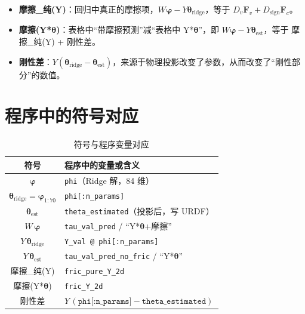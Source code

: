 \documentclass[12pt,a4paper]{article}
\begin{document}
\begin{itemize}[leftmargin=*]
  \item \textbf{摩擦\_纯(Y)}：回归中真正的摩擦项，$W\bm{\varphi} - Y\bm{\theta}_{\mathrm{ridge}}$，等于 $D_v\bm{F}_v + D_{\mathrm{sign}}\bm{F}_c$。
  \item \textbf{摩擦(Y*$\bm{\theta}$)}：表格中``带摩擦预测''减``表格中 Y*$\bm{\theta}$''，即 $W\bm{\varphi} - Y\bm{\theta}_{\mathrm{est}}$，等于 摩擦\_纯(Y) + 刚性差。
  \item \textbf{刚性差}：$Y(\bm{\theta}_{\mathrm{ridge}} - \bm{\theta}_{\mathrm{est}})$，来源于物理投影改变了参数，从而改变了``刚性部分''的数值。
\end{itemize}

\section{程序中的符号对应}

\begin{table}[h]
  \centering
  \caption{符号与程序变量对应}
  \begin{tabular}{cl}
    \toprule
    符号 & 程序中的变量或含义 \\
    \midrule
    $\bm{\varphi}$ & \texttt{phi}（Ridge 解，84 维） \\
    $\bm{\theta}_{\mathrm{ridge}} = \bm{\varphi}_{1:70}$ & \texttt{phi[:n\_params]} \\
    $\bm{\theta}_{\mathrm{est}}$ & \texttt{theta\_estimated}（投影后，写 URDF） \\
    $W\,\bm{\varphi}$ & \texttt{tau\_val\_pred} / ``Y*$\bm{\theta}$+摩擦'' \\
    $Y\,\bm{\theta}_{\mathrm{ridge}}$ & \texttt{Y\_val @ phi[:n\_params]} \\
    $Y\,\bm{\theta}_{\mathrm{est}}$ & \texttt{tau\_val\_pred\_no\_fric} / ``Y*$\bm{\theta}$'' \\
    摩擦\_纯(Y) & \texttt{fric\_pure\_Y\_2d} \\
    摩擦(Y*$\bm{\theta}$) & \texttt{fric\_Y\_2d} \\
    刚性差 & $Y\,(\texttt{phi[:n\_params]} - \texttt{theta\_estimated})$ \\
    \bottomrule
  \end{tabular}
\end{table}

\end{document}
